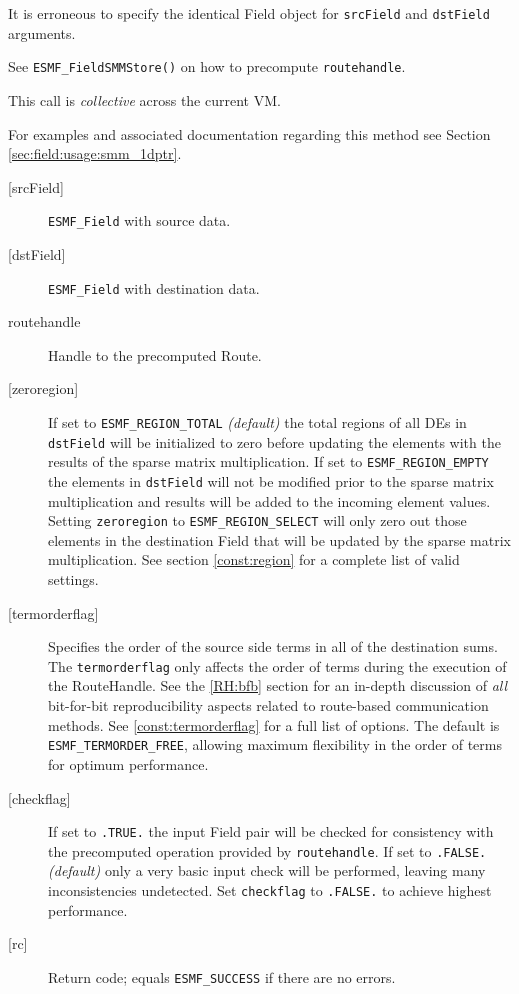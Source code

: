      It is erroneous to specify the identical Field object for {\tt srcField} and
     {\tt dstField} arguments.
  
     See {\tt ESMF\_FieldSMMStore()} on how to precompute 
     {\tt routehandle}.
  
     This call is {\em collective} across the current VM.
  
     For examples and associated documentation regarding this method see Section
     \ref{sec:field:usage:smm_1dptr}. 
  
     \begin{description}
     \item [{[srcField]}]
       {\tt ESMF\_Field} with source data.
     \item [{[dstField]}]
       {\tt ESMF\_Field} with destination data.
     \item [routehandle]
       Handle to the precomputed Route.
     \item [{[zeroregion]}]
       \begin{sloppypar}
       If set to {\tt ESMF\_REGION\_TOTAL} {\em (default)} the total regions of
       all DEs in {\tt dstField} will be initialized to zero before updating the 
       elements with the results of the sparse matrix multiplication. If set to
       {\tt ESMF\_REGION\_EMPTY} the elements in {\tt dstField} will not be
       modified prior to the sparse matrix multiplication and results will be
       added to the incoming element values. Setting {\tt zeroregion} to 
       {\tt ESMF\_REGION\_SELECT} will only zero out those elements in the 
       destination Field that will be updated by the sparse matrix
       multiplication. See section \ref{const:region} for a complete list of
       valid settings.
       \end{sloppypar}
     \item [{[termorderflag]}]
       Specifies the order of the source side terms in all of the destination
       sums. The {\tt termorderflag} only affects the order of terms during
       the execution of the RouteHandle. See the \ref{RH:bfb} section for an
       in-depth discussion of {\em all} bit-for-bit reproducibility
       aspects related to route-based communication methods.
       See \ref{const:termorderflag} for a full list of options.
       The default is {\tt ESMF\_TERMORDER\_FREE}, allowing maximum flexibility
       in the order of terms for optimum performance.
     \item [{[checkflag]}]
       If set to {\tt .TRUE.} the input Field pair will be checked for
       consistency with the precomputed operation provided by {\tt routehandle}.
       If set to {\tt .FALSE.} {\em (default)} only a very basic input check
       will be performed, leaving many inconsistencies undetected. Set
       {\tt checkflag} to {\tt .FALSE.} to achieve highest performance.
     \item [{[rc]}]
       Return code; equals {\tt ESMF\_SUCCESS} if there are no errors.
     \end{description}
   

